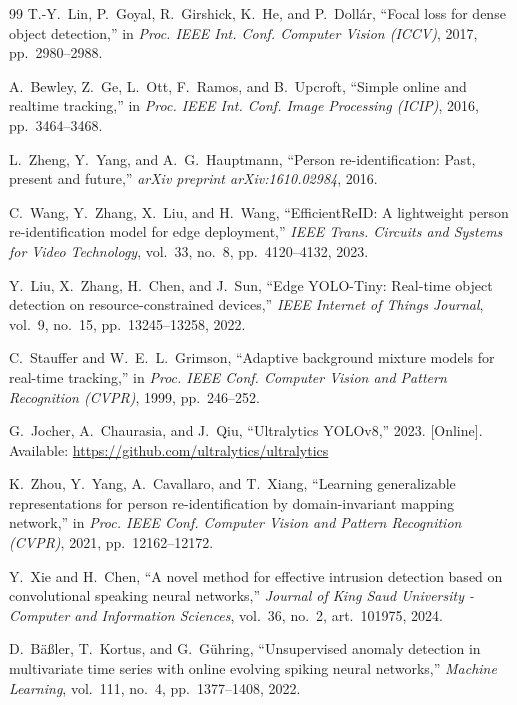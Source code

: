 \documentclass[12pt,a4paper]{report}
\begin{document}
\begin{thebibliography}{99}
T.-Y.~Lin, P.~Goyal, R.~Girshick, K.~He, and P.~Doll{\'a}r, ``Focal loss for dense object detection,'' in \textit{Proc. IEEE Int. Conf. Computer Vision (ICCV)}, 2017, pp.~2980--2988.

A.~Bewley, Z.~Ge, L.~Ott, F.~Ramos, and B.~Upcroft, ``Simple online and realtime tracking,'' in \textit{Proc. IEEE Int. Conf. Image Processing (ICIP)}, 2016, pp.~3464--3468.

L.~Zheng, Y.~Yang, and A.~G.~Hauptmann, ``Person re-identification: Past, present and future,'' \textit{arXiv preprint arXiv:1610.02984}, 2016.

C.~Wang, Y.~Zhang, X.~Liu, and H.~Wang, ``EfficientReID: A lightweight person re-identification model for edge deployment,'' \textit{IEEE Trans. Circuits and Systems for Video Technology}, vol.~33, no.~8, pp.~4120--4132, 2023.

Y.~Liu, X.~Zhang, H.~Chen, and J.~Sun, ``Edge YOLO-Tiny: Real-time object detection on resource-constrained devices,'' \textit{IEEE Internet of Things Journal}, vol.~9, no.~15, pp.~13245--13258, 2022.

C.~Stauffer and W.~E.~L.~Grimson, ``Adaptive background mixture models for real-time tracking,'' in \textit{Proc. IEEE Conf. Computer Vision and Pattern Recognition (CVPR)}, 1999, pp.~246--252.

G.~Jocher, A.~Chaurasia, and J.~Qiu, ``Ultralytics YOLOv8,'' 2023. [Online]. Available: \url{https://github.com/ultralytics/ultralytics}

K.~Zhou, Y.~Yang, A.~Cavallaro, and T.~Xiang, ``Learning generalizable representations for person re-identification by domain-invariant mapping network,'' in \textit{Proc. IEEE Conf. Computer Vision and Pattern Recognition (CVPR)}, 2021, pp.~12162--12172.

Y.~Xie and H.~Chen, ``A novel method for effective intrusion detection based on convolutional speaking neural networks,'' \textit{Journal of King Saud University - Computer and Information Sciences}, vol.~36, no.~2, art.~101975, 2024.

D.~B{\"a}{\ss}ler, T.~Kortus, and G.~G{\"u}hring, ``Unsupervised anomaly detection in multivariate time series with online evolving spiking neural networks,'' \textit{Machine Learning}, vol.~111, no.~4, pp.~1377--1408, 2022.


\end{thebibliography}
\end{document}
